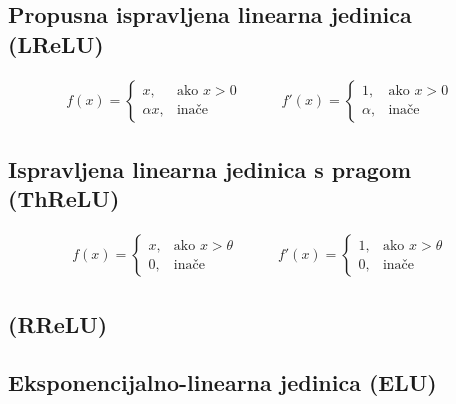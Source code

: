 \documentclass[times, utf8, diplomski]{fer}
\begin{document}
\subsection*{Propusna ispravljena linearna jedinica (LReLU)}

\begin{equation}
\begin{split}
f(x) = 
\begin{cases}
x,			& \text{ako } x > 0 \\
\alpha x,	& \text{inače}
\end{cases}
\end{split}
\qquad
\begin{split}
f'(x) = 
\begin{cases}
1,		& \text{ako } x > 0 \\
\alpha,	& \text{inače}
\end{cases}
\end{split}
\end{equation}

\subsection*{Ispravljena linearna jedinica s pragom (ThReLU)}

\begin{equation}
\begin{split}
f(x) = 
\begin{cases}
x,		& \text{ako } x > \theta \\
0,		& \text{inače}
\end{cases}
\end{split}
\qquad
\begin{split}
f'(x) = 
\begin{cases}
1,		& \text{ako } x > \theta \\
0,		& \text{inače}
\end{cases}
\end{split}
\end{equation}

\subsection*{(RReLU)}

\subsection*{Eksponencijalno-linearna jedinica (ELU)}
\end{document}

